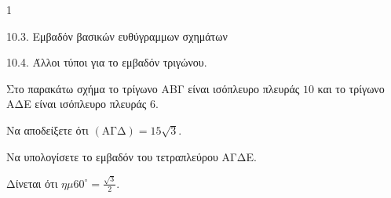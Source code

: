 \begin{ylh}{1}
    \item 10.3. Εμβαδόν βασικών ευθύγραμμων σχημάτων
    \item 10.4. Άλλοι τύποι για το εμβαδόν τριγώνου.
\end{ylh}
\begin{figure} %
    \centering
\end{figure}
Στο παρακάτω σχήμα το τρίγωνο ΑΒΓ είναι ισόπλευρο πλευράς $10$ και το τρίγωνο ΑΔΕ είναι ισόπλευρο πλευράς $6$.
\begin{alist}
\item Να αποδείξετε ότι $(\text{ΑΓΔ}) = 15\sqrt{3}$. 
\item Να υπολογίσετε το εμβαδόν του τετραπλεύρου ΑΓΔΕ. 
\end{alist}
Δίνεται ότι $\eta\mu60^\circ = \frac{\sqrt{3}}{2}$.